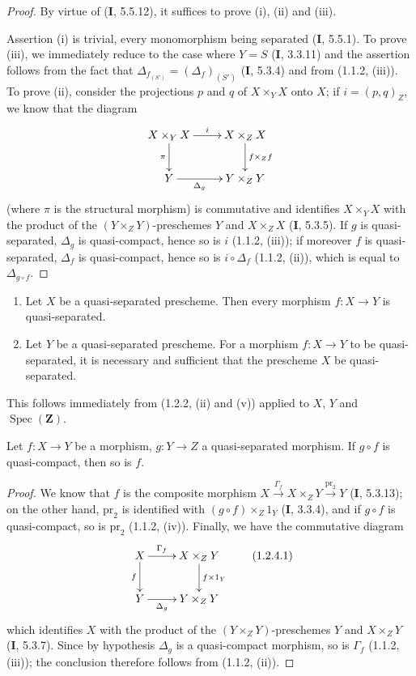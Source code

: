 \begin{proof}
By virtue of (\textbf{I}, 5.5.12), it suffices to prove (i), (ii) and (iii).

Assertion (i) is trivial, every monomorphism being separated (\textbf{I}, 5.5.1).
To prove (iii), we immediately reduce to the case where $Y=S$ (\textbf{I}, 3.3.11) and
the assertion follows from the fact that
$\Delta_{f_{(S')}}=(\Delta_f)_{(S')}$ (\textbf{I}, 5.3.4) and from (1.1.2, (iii)). To
prove (ii), consider the projections $p$ and $q$ of $X\times_Y X$ onto
$X$; if $i=(p,q)_Z$, we know that the diagram
\[
\xymatrix{
  X\times_Y X \ar[r]^-{i} \ar[d]_-{\pi} & X\times_Z X
    \ar[d]^-{f\times_Z f} \\
  Y \ar[r]_-{\Delta_g} & Y\times_Z Y
}
\]
(where $\pi$ is the structural morphism) is commutative and identifies
$X\times_Y X$ with the product of the $(Y\times_Z Y)$-preschemes $Y$ and
$X\times_Z X$ (\textbf{I}, 5.3.5). If $g$ is quasi-separated, $\Delta_g$ is
quasi-compact, hence so is $i$ (1.1.2, (iii)); if moreover $f$
is quasi-separated, $\Delta_f$ is quasi-compact, hence so is
$i\circ\Delta_f$ (1.1.2, (ii)), which is equal to $\Delta_{g\circ f}$.
\end{proof}

\begin{corollary}[1.2.3]
\label{IV.1.2.3}
\begin{enumerate}
  \item[\textup{(i)}] Let $X$ be a quasi-separated prescheme. Then every morphism
  $f:X\to Y$ is quasi-separated.
  \item[\textup{(ii)}] Let $Y$ be a quasi-separated prescheme. For a morphism
  $f:X\to Y$ to be quasi-separated, it is necessary and sufficient that the
  prescheme $X$ be quasi-separated.
\end{enumerate}
\end{corollary}

This follows immediately from (1.2.2, (ii) and (v)) applied to $X$, $Y$ and
$\operatorname{Spec}(\mathbf Z)$.

\begin{proposition}[1.2.4]
\label{IV.1.2.4}
Let $f:X\to Y$ be a morphism, $g:Y\to Z$ a quasi-separated morphism. If
$g\circ f$ is quasi-compact, then so is $f$.
\end{proposition}

\begin{proof}
We know that $f$ is the composite morphism
$X\xrightarrow{\Gamma_f}X\times_ZY\xrightarrow{\mathrm{pr}_2}Y$
(\textbf{I}, 5.3.13); on the other hand, $\mathrm{pr}_2$ is identified with
$(g\circ f)\times_Z1_Y$ (\textbf{I}, 3.3.4), and if $g\circ f$ is quasi-compact, so
is $\mathrm{pr}_2$ (1.1.2, (iv)). Finally, we have the commutative
diagram
\[
\xymatrix{
  X \ar[r]^-{\Gamma_f} \ar[d]_-{f} & X\times_ZY
    \ar[d]^-{f\times 1_Y} \\
  Y \ar[r]_-{\Delta_g} & Y\times_ZY
}
\tag{1.2.4.1}
\label{IV.1.2.4.1}
\]
which identifies $X$ with the product of the $(Y\times_ZY)$-preschemes $Y$ and
$X\times_ZY$ (\textbf{I}, 5.3.7). Since by hypothesis $\Delta_g$ is a quasi-compact
morphism, so is $\Gamma_f$ (1.1.2, (iii)); the conclusion
therefore follows from (1.1.2, (ii)).
\end{proof}

